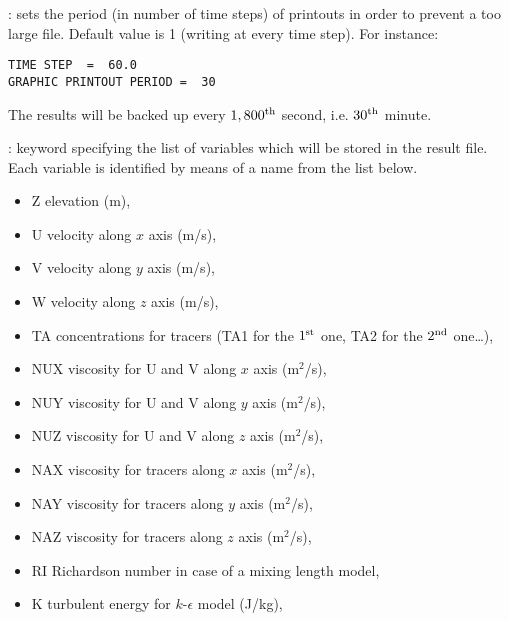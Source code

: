 : sets the period (in number of time steps) of
printouts in order to prevent a too large file.  Default value is 1 (writing at
every time step). For instance:

\begin{lstlisting}[language=TelemacCas]
TIME STEP  =  60.0
GRAPHIC PRINTOUT PERIOD =  30
\end{lstlisting}

The results will be backed up every ${1,800}^{\rm{th}}$ second, i.e.
${30}^{\rm{th}}$ minute.

: keyword specifying the list of
variables which will be stored in the result file. Each variable is identified
by means of a name from the list below.

\begin{itemize}
\item Z elevation (m),

\item U velocity along $x$ axis (m/s),

\item V velocity along $y$ axis (m/s),

\item W velocity along $z$ axis (m/s),

\item TA concentrations for tracers (TA1 for the ${1}^{\rm{st}}$ one, TA2 for the
${2}^{\rm{nd}}$ one\dots ),

\item NUX viscosity for U and V along $x$ axis (m${}^{2}$/s),

\item NUY viscosity for U and V along $y$ axis (m${}^{2}$/s),

\item NUZ viscosity for U and V along $z$ axis (m${}^{2}$/s),

\item NAX viscosity for tracers along $x$ axis (m${}^{2}$/s),

\item NAY viscosity for tracers along $y$ axis (m${}^{2}$/s),

\item NAZ viscosity for tracers along $z$ axis (m${}^{2}$/s),

\item RI Richardson number in case of a mixing length model,

\item K turbulent energy for $k$-$\epsilon$ model (J/kg),


\end{itemize}
